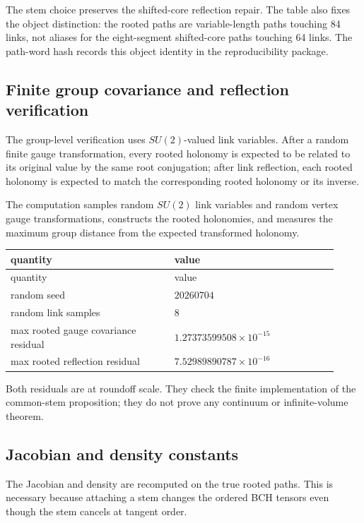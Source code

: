 \documentclass[10pt]{article}
\begin{document}
The stem choice preserves the shifted-core reflection repair.  The table also fixes the object distinction: the rooted paths are variable-length paths touching 84 links, not aliases for the eight-segment shifted-core paths touching 64 links.  The path-word hash records this object identity in the reproducibility package.

\subsection{Finite group covariance and reflection verification}

The group-level verification uses \(SU(2)\)-valued link variables.  After a random finite gauge transformation, every rooted holonomy is expected to be related to its original value by the same root conjugation; after link reflection, each rooted holonomy is expected to match the corresponding rooted holonomy or its inverse.

The computation samples random \(SU(2)\) link variables and random vertex gauge transformations, constructs the rooted holonomies, and measures the maximum group distance from the expected transformed holonomy.

\begin{center}
\small
\begin{longtable}{|p{0.46\linewidth}|p{0.46\linewidth}|}
\hline
quantity & value \\
\hline
\endfirsthead
\hline
quantity & value \\
\hline
\endhead
random seed & \(20260704\) \\
\hline
random link samples & 8 \\
\hline
max rooted gauge covariance residual & \(1.27373599508\times10^{-15}\) \\
\hline
max rooted reflection residual & \(7.52989890787\times10^{-16}\) \\
\hline
\end{longtable}
\end{center}

Both residuals are at roundoff scale.  They check the finite implementation of the common-stem proposition; they do not prove any continuum or infinite-volume theorem.

\subsection{Jacobian and density constants}

The Jacobian and density are recomputed on the true rooted paths.  This is necessary because attaching a stem changes the ordered BCH tensors even though the stem cancels at tangent order.
\end{document}
